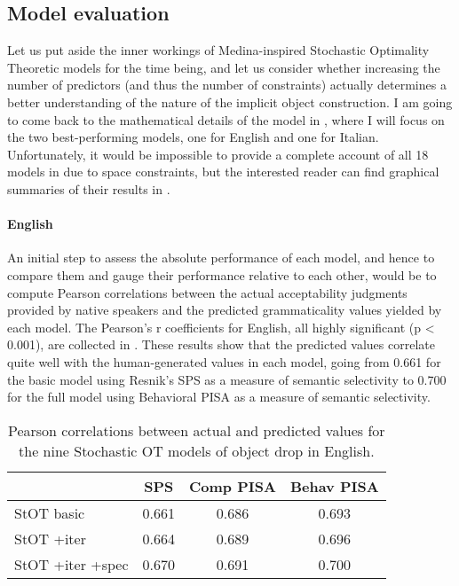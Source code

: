 

\subsection{Model evaluation} 

Let us put aside the inner workings of Medina-inspired Stochastic Optimality Theoretic models for the time being, and let us consider whether increasing the number of predictors (and thus the number of constraints) actually determines a better understanding of the nature of the implicit object construction. I am going to come back to the mathematical details of the model in , where I will focus on the two best-performing models, one for English and one for Italian. Unfortunately, it would be impossible to provide a complete account of all 18 models in  due to space constraints, but the interested reader can find graphical summaries of their results in .

\paragraph{English} An initial step to assess the absolute performance of each model, and hence to compare them and gauge their performance relative to each other, would be to compute Pearson correlations between the actual acceptability judgments provided by native speakers and the predicted grammaticality values yielded by each model. The Pearson's r coefficients for English, all highly significant (p < 0.001), are collected in . These results show that the predicted values correlate quite well with the human-generated values in each model, going from 0.661 for the basic model using Resnik's SPS as a measure of semantic selectivity to 0.700 for the full model using Behavioral PISA as a measure of semantic selectivity.

\begin{table}[htb] %
\caption{Pearson correlations between actual and predicted values for the nine Stochastic OT models of object drop in English.}
\begin{tabular}{l|ccc}
& SPS & Comp PISA & Behav PISA \\
\hline
StOT basic           & 0.661        & 0.686     & 0.693      \\
StOT +iter           & 0.664        & 0.689     & 0.696      \\
StOT +iter +spec     & 0.670        & 0.691     & 0.700     
\end{tabular}
\end{table}

